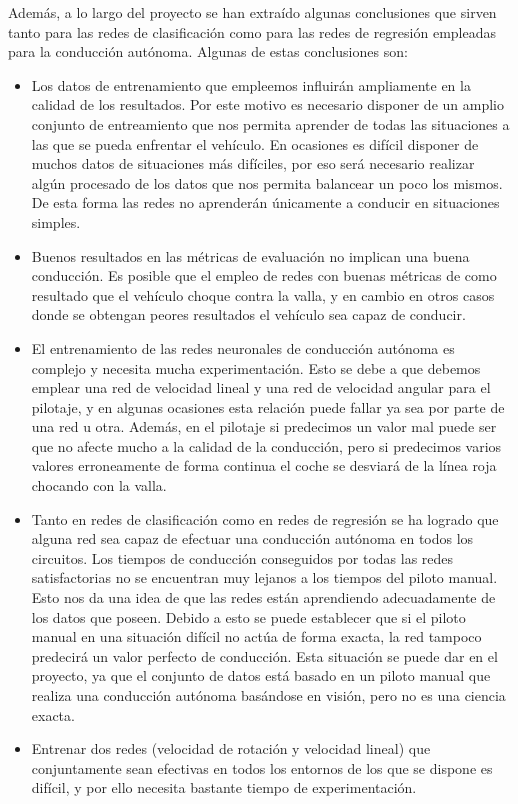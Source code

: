 Además, a lo largo del proyecto se han extraído algunas conclusiones que sirven tanto para las redes de clasificación como para las redes de regresión empleadas para la conducción autónoma. Algunas de estas conclusiones son:\\

\begin{itemize}
    \item Los datos de entrenamiento que empleemos influirán ampliamente en la calidad de los resultados. Por este motivo es necesario disponer de un amplio conjunto de entreamiento que nos permita aprender de todas las situaciones a las que se pueda enfrentar el vehículo. En ocasiones es difícil disponer de muchos datos de situaciones más difíciles, por eso será necesario realizar algún procesado de los datos que nos permita balancear un poco los mismos. De esta forma las redes no aprenderán únicamente a conducir en situaciones simples.
    
    \item Buenos resultados en las métricas de evaluación no implican una buena conducción. Es posible que el empleo de redes con buenas métricas de como resultado que el vehículo choque contra la valla, y en cambio en otros casos donde se obtengan peores resultados el vehículo sea capaz de conducir.
    
    \item El entrenamiento de las redes neuronales de conducción autónoma es complejo y necesita mucha experimentación. Esto se debe a que debemos emplear una red de velocidad lineal y una red de velocidad angular para el pilotaje, y en algunas ocasiones esta relación puede fallar ya sea por parte de una red u otra. Además, en el pilotaje si predecimos un valor mal puede ser que no afecte mucho a la calidad de la conducción, pero si predecimos varios valores erroneamente de forma continua el coche se desviará de la línea roja chocando con la valla.
    
    \item Tanto en redes de clasificación como en redes de regresión se ha logrado que alguna red sea capaz de efectuar una conducción autónoma en todos los circuitos. Los tiempos de conducción conseguidos por todas las redes satisfactorias no se encuentran muy lejanos a los tiempos del piloto manual. Esto nos da una idea de que las redes están aprendiendo adecuadamente de los datos que poseen. Debido a esto se puede establecer que si el piloto manual en una situación difícil no actúa de forma exacta, la red tampoco predecirá un valor perfecto de conducción. Esta situación se puede dar en el proyecto, ya que el conjunto de datos está basado en un piloto manual que realiza una conducción autónoma basándose en visión, pero no es una ciencia exacta.
    
    \item Entrenar dos redes (velocidad de rotación y velocidad lineal) que conjuntamente sean efectivas en todos los entornos de los que se dispone es difícil, y por ello necesita bastante tiempo de experimentación. 
\end{itemize}


